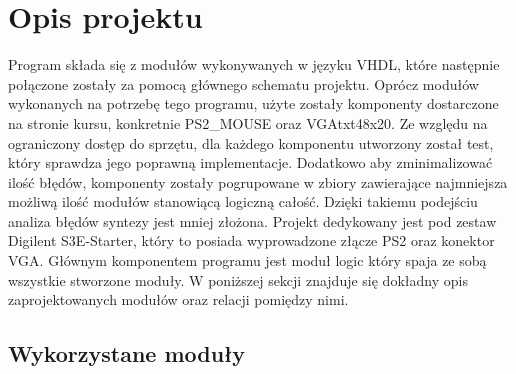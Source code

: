 \documentclass[polish,polish,a4paper]{article}
\begin{document}
\section{Opis projektu}
Program składa się z modułów wykonywanych w języku VHDL, które następnie połączone zostały za pomocą głównego schematu projektu.
Oprócz modułów wykonanych na potrzebę tego programu, użyte zostały komponenty dostarczone na stronie kursu, konkretnie PS2\_MOUSE oraz VGAtxt48x20.
Ze względu na ograniczony dostęp do sprzętu, dla każdego komponentu utworzony został test, który sprawdza jego poprawną implementacje.
Dodatkowo aby zminimalizować ilość błędów, komponenty zostały pogrupowane w zbiory zawierające najmniejsza możliwą ilość modułów stanowiącą logiczną całość.
Dzięki takiemu podejściu analiza błędów syntezy jest mniej złożona.
Projekt dedykowany jest pod zestaw Digilent S3E-Starter, który to posiada wyprowadzone złącze PS2 oraz konektor VGA.
\newline
Głównym komponentem programu jest moduł logic który spaja ze sobą wszystkie stworzone moduły.
W poniższej sekcji znajduje się dokładny opis zaprojektowanych modułów oraz relacji pomiędzy nimi. 
\newpage
\subsection{Wykorzystane moduły}
\end{document}
